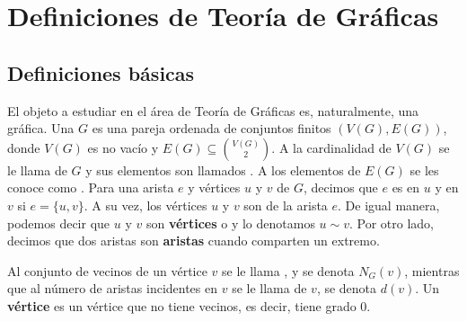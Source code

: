 \chapter{Definiciones de Teor\'ia de Gr\'aficas}%
\label{cap:defs grafs}

\section{Definiciones b\'asicas}%
\label{sec:def-basicas}

El objeto a estudiar en el \'area de Teor\'ia de Gr\'aficas es, naturalmente,
una gr\'afica. Una  $G$ es una pareja ordenada de conjuntos
finitos $(V(G), E(G))$, donde $V(G)$ es no vac\'io y $E(G) \subseteq
\binom{V(G)}{2}$. A la cardinalidad de $V(G)$ se le llama
 de $G$ y sus elementos son llamados
. A los elementos de $E(G)$ se les conoce como
. Para una arista $e$ y v\'ertices $u$ y $v$ de $G$, decimos que
$e$ es  en $u$ y en $v$ si $e= \{u, v\}$. A su
vez, los v\'ertices $u$ y $v$ son  de la arista
$e$. De igual manera, podemos decir que $u$ y $v$ son \textbf{v\'ertices}
 o
 y lo denotamos $u \sim v$. Por otro lado,
decimos que dos aristas son \textbf{aristas}
 cuando comparten un
extremo. 

Al conjunto de vecinos de un v\'ertice $v$ se le llama , y se
denota $N_G(v)$, mientras que al n\'umero de aristas incidentes en $v$ se le
llama  de $v$, se denota $d(v)$. Un \textbf{v\'ertice}
 es  un v\'ertice que no tiene vecinos, es
decir, tiene grado $0$.

